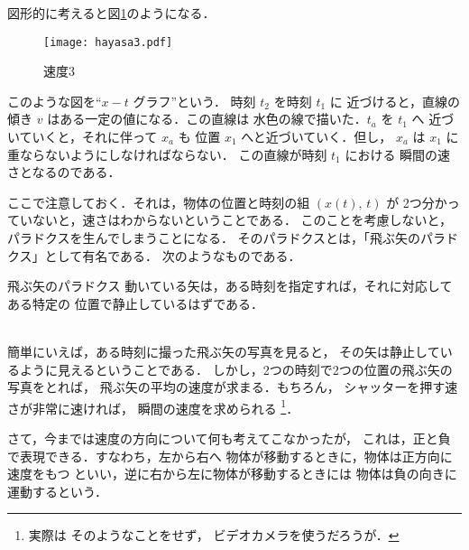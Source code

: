                 図形的に考えると図\ref{fig:hayasa3}のようになる．
                \begin{figure}[hbt]
                    \begin{center}
                        \texttt{[image: hayasa3.pdf]}
                        \caption{速度3}
                        \label{fig:hayasa3}
                    \end{center}
                \end{figure}

                このような図を“$x-t$ グラフ”という．
                時刻 $t_{2}$ を時刻 $t_{1}$ に
                近づけると，直線の傾き $v$ はある一定の値になる．この直線は
                水色の線で描いた．$t_{a}$ を $t_{1}$ へ
                近づいていくと，それに伴って $x_{a}$ も
                位置 $x_{1}$ へと近づいていく．但し，
                $x_{a}$ は $x_{1}$ に重ならないようにしなければならない．
                この直線が時刻 $t_{1}$ における
                瞬間の速さとなるのである．

                ここで注意しておく．それは，物体の位置と時刻の組 $(x(t),\,t)$ が
                2つ分かっていないと，速さはわからないということである．
                このことを考慮しないと，パラドクスを生んでしまうことになる．
                そのパラドクスとは，「飛ぶ矢のパラドクス」として有名である．
                次のようなものである．\\
                \begin{itembox}[l]{飛ぶ矢のパラドクス}
                動いている矢は，ある時刻を指定すれば，それに対応してある特定の
                位置で静止しているはずである．
                \end{itembox}\\

                簡単にいえば，ある時刻に撮った飛ぶ矢の写真を見ると，
                その矢は静止しているように見えるということである．
                しかし，2つの時刻で2つの位置の飛ぶ矢の写真をとれば，
                飛ぶ矢の平均の速度が求まる．もちろん，
                シャッターを押す速さが非常に速ければ，
                瞬間の速度を求められる
                \footnote{
                実際は
                そのようなことをせず，
                ビデオカメラを使うだろうが．}．

                さて，今までは速度の方向について何も考えてこなかったが，
                これは，正と負で表現できる．すなわち，左から右へ
                物体が移動するときに，物体は正方向に速度をもつ
                といい，逆に右から左に物体が移動するときには
                物体は負の向きに運動するという．


